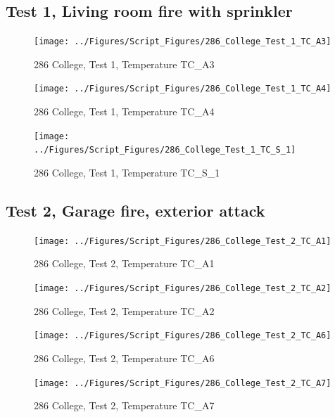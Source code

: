 \documentclass[12pt,oneside]{book}
\begin{document}
\subsection{Test 1, Living room fire with sprinkler}

\begin{figure}[!ht]
\texttt{[image: ../Figures/Script\_Figures/286\_College\_Test\_1\_TC\_A3]}
\caption{286 College, Test 1, Temperature TC\_A3}
\label{fig:286_College_Test_1_TC_A3}
\end{figure}

\begin{figure}[!ht]
\texttt{[image: ../Figures/Script\_Figures/286\_College\_Test\_1\_TC\_A4]}
\caption{286 College, Test 1, Temperature TC\_A4}
\label{fig:286_College_Test_1_TC_A4}
\end{figure}

\begin{figure}[!ht]
\texttt{[image: ../Figures/Script\_Figures/286\_College\_Test\_1\_TC\_S\_1]}
\caption{286 College, Test 1, Temperature TC\_S\_1}
\label{fig:286_College_Test_1_TC_S_1}
\end{figure}


\clearpage


\subsection{Test 2, Garage fire, exterior attack}

\begin{figure}[!ht]
\texttt{[image: ../Figures/Script\_Figures/286\_College\_Test\_2\_TC\_A1]}
\caption{286 College, Test 2, Temperature TC\_A1}
\label{fig:286_College_Test_2_TC_A1}
\end{figure}

\begin{figure}[!ht]
\texttt{[image: ../Figures/Script\_Figures/286\_College\_Test\_2\_TC\_A2]}
\caption{286 College, Test 2, Temperature TC\_A2}
\label{fig:286_College_Test_2_TC_A2}
\end{figure}

\begin{figure}[!ht]
\texttt{[image: ../Figures/Script\_Figures/286\_College\_Test\_2\_TC\_A6]}
\caption{286 College, Test 2, Temperature TC\_A6}
\label{fig:286_College_Test_2_TC_A6}
\end{figure}

\begin{figure}[!ht]
\texttt{[image: ../Figures/Script\_Figures/286\_College\_Test\_2\_TC\_A7]}
\caption{286 College, Test 2, Temperature TC\_A7}
\label{fig:286_College_Test_2_TC_A7}
\end{figure}
\end{document}
